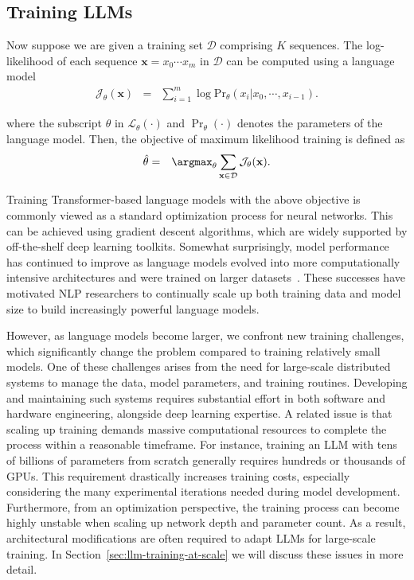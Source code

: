 \subsection{Training LLMs}

\noindent Now suppose we are given a training set $\mathcal{D}$ comprising $K$ sequences. The log-likelihood of each sequence $\mathbf{x} = x_0 \cdots x_m$ in $\mathcal{D}$ can be computed using a language model
\begin{eqnarray}
\mathcal{J}_{\theta}(\mathbf{x}) & = & \sum_{i=1}^{m} \log \mathrm{Pr}_{\theta}(x_i|x_0,\cdots,x_{i-1}) \label{eq:llm-training-loss-likelihood}.
\end{eqnarray}

\noindent where the subscript $\theta$ in $\mathcal{L}_{\theta}(\cdot)$ and $\Pr_{\theta}(\cdot)$ denotes the parameters of the language model. Then, the objective of maximum likelihood training is defined as
\begin{eqnarray}
\hat{\theta} & = & \argmax_{\theta} \sum_{\mathbf{x} \in \mathcal{D}} \mathcal{J}_{\theta}(\mathbf{x}) \label{eq:llm-training-mle}.
\end{eqnarray}

Training Transformer-based language models with the above objective is commonly viewed as a standard optimization process for neural networks. This can be achieved using gradient descent algorithms, which are widely supported by off-the-shelf deep learning toolkits. Somewhat surprisingly, model performance has continued to improve as language models evolved into more computationally intensive architectures and were trained on larger datasets~\cite{kaplan-etal:2020scaling}. These successes have motivated NLP researchers to continually scale up both training data and model size to build increasingly powerful language models.

However, as language models become larger, we confront new training challenges, which significantly change the problem compared to training relatively small models. One of these challenges arises from the need for large-scale distributed systems to manage the data, model parameters, and training routines. Developing and maintaining such systems requires substantial effort in both software and hardware engineering, alongside deep learning expertise. A related issue is that scaling up training demands massive computational resources to complete the process within a reasonable timeframe. For instance, training an LLM with tens of billions of parameters from scratch generally requires hundreds or thousands of GPUs. This requirement drastically increases training costs, especially considering the many experimental iterations needed during model development. Furthermore, from an optimization perspective, the training process can become highly unstable when scaling up network depth and parameter count. As a result, architectural modifications are often required to adapt LLMs for large-scale training. In Section~\ref{sec:llm-training-at-scale} we will discuss these issues in more detail.


